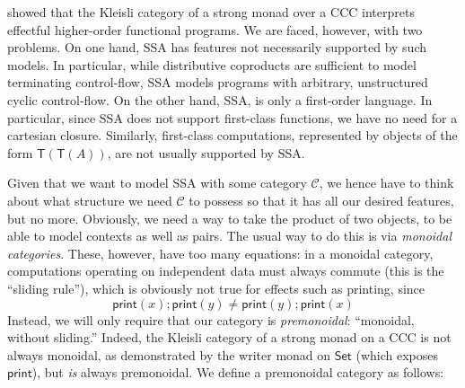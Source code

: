 \documentclass[acmsmall,screen,review]{acmart}
\newcommand{\mc}[1]{\ensuremath{\mathcal{#1}}}
\newcommand{\ms}[1]{\ensuremath{\mathsf{#1}}}
\begin{document}
\citet{moggi-91-monad} showed that the Kleisli category of a strong monad over a CCC interprets
effectful higher-order functional programs. We are faced, however, with two problems. On one hand,
SSA has features not necessarily supported by such models. In particular, while distributive
coproducts are sufficient to model terminating control-flow, SSA models programs with arbitrary,
unstructured cyclic control-flow. On the other hand, SSA, is only a first-order language. In
particular, since SSA does not support first-class functions, we have no need for a cartesian
closure. Similarly, first-class computations, represented by objects of the form
$\ms{T}(\ms{T}(A))$, are not usually supported by SSA.

Given that we want to model SSA with some category $\mc{C}$, we hence have to think about what
structure we need $\mc{C}$ to possess so that it has all our desired features, but no more.
Obviously, we need a way to take the product of two objects, to be able to model contexts as well as
pairs. The usual way to do this is via \emph{monoidal categories}. These, however, have too many
equations: in a monoidal category, computations operating on independent data must always commute
(this is the ``sliding rule''), which is obviously not true for effects such as printing, since
$$
\ms{print}(x) ; \ms{print}(y) \neq \ms{print}(y) ; \ms{print}(x)
$$
Instead, we will only require that our category is \emph{premonoidal}: ``monoidal, without
sliding.'' Indeed, the Kleisli category of a strong monad on a CCC is not always monoidal, as
demonstrated by the writer monad on $\ms{Set}$ (which exposes $\ms{print}$), but \emph{is} always
premonoidal. We define a premonoidal category as follows:
\end{document}
